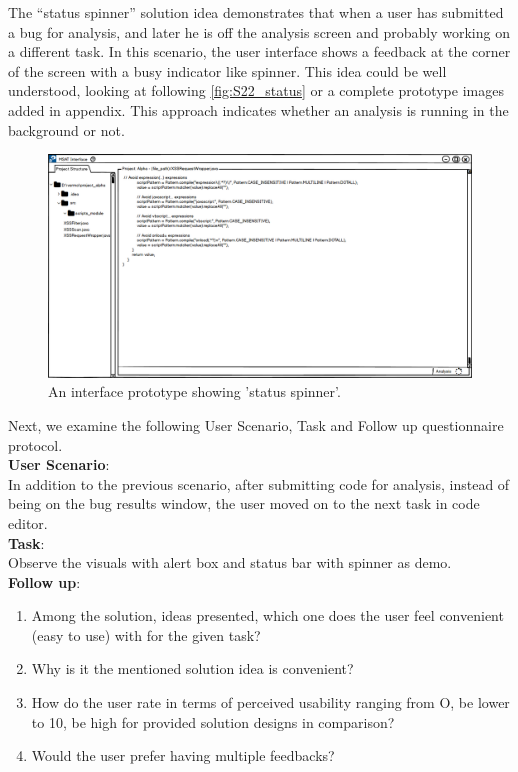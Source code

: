 The “status spinner” solution idea demonstrates that when a user has submitted a bug for analysis, and later he is off the analysis screen and probably working on a different task. In this scenario, the user interface shows a feedback at the corner of the screen with a busy indicator like spinner. This idea could be well understood, looking at following \autoref{fig:S22_status} or a complete prototype images added in appendix. This approach indicates whether an analysis is running in the background or not. \\


\begin{figure}[hbt!]
	\centering
	\includegraphics[width=\linewidth]{figures/solution_ideas_snaps/S22_status}
	\caption{An interface prototype showing 'status spinner'.}
	\label{fig:S22_status}
\end{figure}

Next, we examine the following User Scenario, Task and Follow up questionnaire protocol. \\

\textbf{User Scenario}: \\

In addition to the previous scenario, after submitting code for analysis, instead of being on the bug results window, the user moved on to the next task in code editor. \\

\textbf{Task}: \\

Observe the visuals with alert box and status bar with spinner as demo. \\

\textbf{Follow up}: \\

\begin{enumerate}
\item Among the solution, ideas presented, which one does the user feel convenient (easy to use) with for the given task?
\item Why is it the mentioned solution idea is convenient?
\item How do the user rate in terms of perceived usability ranging from O, be lower to 10, be high for provided solution designs in comparison?
\item Would the user prefer having multiple feedbacks?
\end{enumerate}

